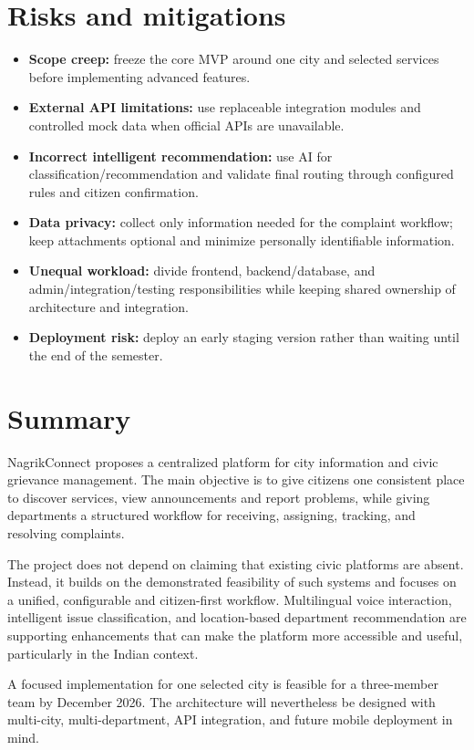 \documentclass[11pt,a4paper]{article}
\begin{document}
\section{Risks and mitigations}
\begin{itemize}[leftmargin=0.7cm]
    \item \textbf{Scope creep:} freeze the core MVP around one city and selected services before implementing advanced features.
    \item \textbf{External API limitations:} use replaceable integration modules and controlled mock data when official APIs are unavailable.
    \item \textbf{Incorrect intelligent recommendation:} use AI for classification/recommendation and validate final routing through configured rules and citizen confirmation.
    \item \textbf{Data privacy:} collect only information needed for the complaint workflow; keep attachments optional and minimize personally identifiable information.
    \item \textbf{Unequal workload:} divide frontend, backend/database, and admin/integration/testing responsibilities while keeping shared ownership of architecture and integration.
    \item \textbf{Deployment risk:} deploy an early staging version rather than waiting until the end of the semester.
\end{itemize}

\section{Summary}
NagrikConnect proposes a centralized platform for city information and civic grievance management. The main objective is to give citizens one consistent place to discover services, view announcements and report problems, while giving departments a structured workflow for receiving, assigning, tracking, and resolving complaints.

The project does not depend on claiming that existing civic platforms are absent. Instead, it builds on the demonstrated feasibility of such systems and focuses on a unified, configurable and citizen-first workflow. Multilingual voice interaction, intelligent issue classification, and location-based department recommendation are supporting enhancements that can make the platform more accessible and useful, particularly in the Indian context.

A focused implementation for one selected city is feasible for a three-member team by December 2026. The architecture will nevertheless be designed with multi-city, multi-department, API integration, and future mobile deployment in mind.
\end{document}
